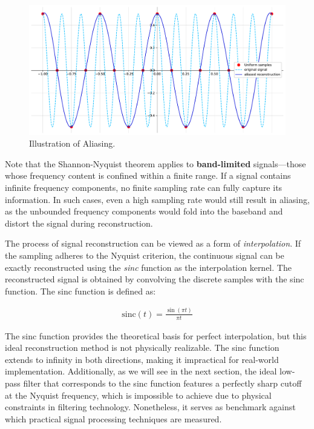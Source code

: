 \begin{figure}[!h]
  \centering
  \includegraphics[width=0.85\linewidth]{img/ch2/aliasing-signal.pdf}
  \caption{Illustration of Aliasing.}
  \label{f:aliasing-example}
\end{figure}

Note that the Shannon-Nyquist theorem applies to \textbf{band-limited} signals—those whose frequency content is confined within a finite range. If a signal contains infinite frequency components, no finite sampling rate can fully capture its information. In such cases, even a high sampling rate would still result in aliasing, as the unbounded frequency components would fold into the baseband and distort the signal during reconstruction.

The process of signal reconstruction can be viewed as a form of \textit{interpolation}. If the sampling adheres to the Nyquist criterion, the continuous signal can be exactly reconstructed using the \textit{sinc} function as the interpolation kernel. The reconstructed signal is obtained by convolving the discrete samples with the sinc function. The sinc function is defined as:

\begin{align}
  \text{sinc}(t) = \frac{\sin(\pi t)}{\pi t}
\end{align}

The sinc function provides the theoretical basis for perfect interpolation, but this ideal reconstruction method is not physically realizable. The sinc function extends to infinity in both directions, making it impractical for real-world implementation. Additionally, as we will see in the next section, the ideal low-pass filter that corresponds to the sinc function features a perfectly sharp cutoff at the Nyquist frequency, which is impossible to achieve due to physical constraints in filtering technology. Nonetheless, it serves as benchmark against which practical signal processing techniques are measured.

